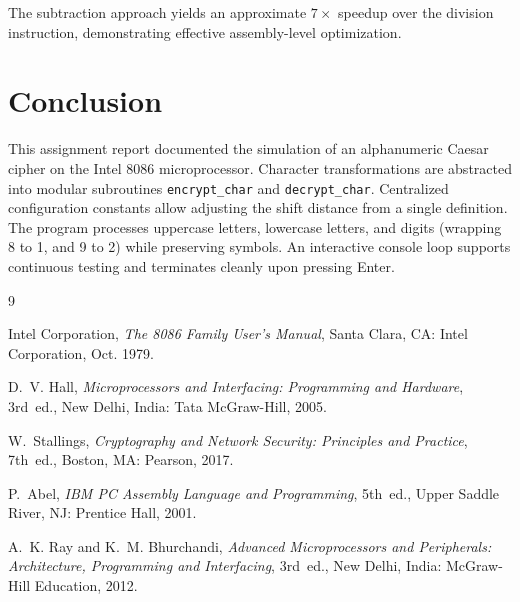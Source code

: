 \documentclass[11pt,a4paper]{article}
\begin{document}
The subtraction approach yields an approximate $7\times$ speedup over the division instruction, demonstrating effective assembly-level optimization.

\section{Conclusion}
This assignment report documented the simulation of an alphanumeric Caesar cipher on the Intel 8086 microprocessor. Character transformations are abstracted into modular subroutines \texttt{encrypt\_char} and \texttt{decrypt\_char}. Centralized configuration constants allow adjusting the shift distance from a single definition. The program processes uppercase letters, lowercase letters, and digits (wrapping 8 to 1, and 9 to 2) while preserving symbols. An interactive console loop supports continuous testing and terminates cleanly upon pressing Enter.

\begin{thebibliography}{9}

Intel Corporation,
\emph{The 8086 Family User's Manual},
Santa Clara, CA: Intel Corporation, Oct. 1979.

D.~V. Hall,
\emph{Microprocessors and Interfacing: Programming and Hardware},
3rd~ed., New Delhi, India: Tata McGraw-Hill, 2005.

W.~Stallings,
\emph{Cryptography and Network Security: Principles and Practice},
7th~ed., Boston, MA: Pearson, 2017.

P.~Abel,
\emph{IBM PC Assembly Language and Programming},
5th~ed., Upper Saddle River, NJ: Prentice Hall, 2001.

A.~K. Ray and K.~M. Bhurchandi,
\emph{Advanced Microprocessors and Peripherals: Architecture, Programming and Interfacing},
3rd~ed., New Delhi, India: McGraw-Hill Education, 2012.

\end{thebibliography}
\end{document}
